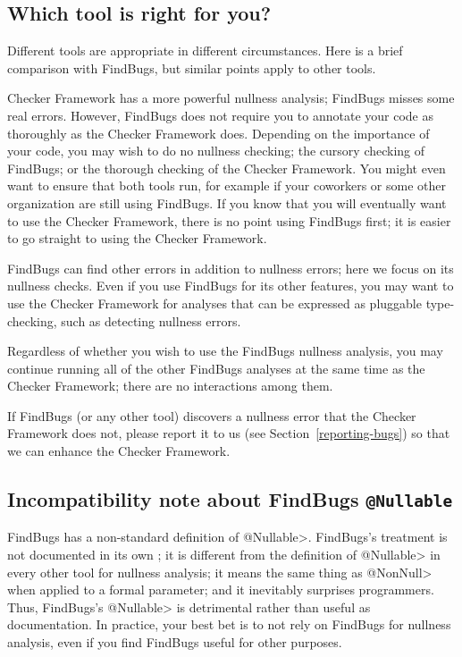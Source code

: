 \subsection{Which tool is right for you?\label{choosing-nullness-tool}}

Different tools are appropriate in different circumstances.  Here is a
brief comparison with FindBugs, but similar points apply to other tools.

Checker Framework has a more powerful nullness analysis; FindBugs misses
some real
errors.  However, FindBugs does not require you to annotate your code as
thoroughly as the Checker Framework does.  Depending on the importance of
your code, you may wish to do no nullness checking; the cursory checking of
FindBugs; or the thorough checking of the Checker Framework.  You might
even want to ensure that both tools run, for example if your coworkers or
some other organization are still using FindBugs.  If you know that you
will eventually want to use the Checker Framework, there is no point using
FindBugs first; it is easier to go straight to using the Checker Framework.

FindBugs can find other errors in addition to nullness errors; here
we focus on its nullness checks.  Even if you use FindBugs for its other
features, you may want to use the Checker Framework for analyses that can
be expressed as pluggable type-checking, such as detecting nullness errors.

Regardless of whether you wish to use the FindBugs nullness analysis, you
may continue running all of the other FindBugs analyses at the same time as
the Checker Framework; there are no interactions among them.

If FindBugs (or any other tool) discovers a nullness error that the Checker
Framework does not, please report it to us (see
Section~\ref{reporting-bugs}) so that we can enhance the Checker Framework.



\subsection{Incompatibility note about FindBugs \tt{@Nullable}\label{findbugs-nullable}}

FindBugs has a non-standard definition of \<@Nullable>.  FindBugs's treatment is not
documented in its own
;
it is different from the definition of \<@Nullable> in every other tool for
nullness analysis; it means the same thing as \<@NonNull> when applied to a
formal parameter; and it inevitably surprises programmers.  Thus, FindBugs's
\<@Nullable> is detrimental rather than useful as documentation.
In practice, your best bet is to not rely on FindBugs for nullness analysis,
even if you find FindBugs useful for other purposes.


